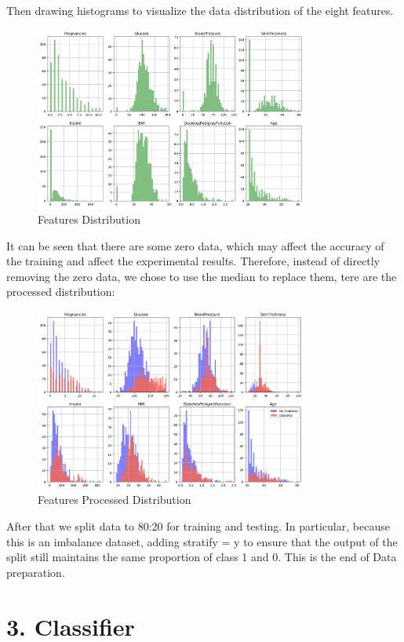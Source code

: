 \documentclass[11pt]{article}
\begin{document}
Then drawing histograms to visualize the data distribution of the eight features.
\begin{figure}[H]
    \centering
    \includegraphics[width=0.8\textwidth]{h8}
    \caption{Features Distribution}
\end{figure}

It can be seen that there are some zero data, which may affect the accuracy of the training and affect the experimental results. Therefore, instead of directly removing the zero data, we chose to use the median to replace them, tere are the processed distribution:
\begin{figure}[H]
    \centering
    \includegraphics[width=0.8\textwidth]{h8opt}
    \caption{Features Processed Distribution}
\end{figure}

After that we split data to 80:20 for training and testing. In particular, because this is an imbalance dataset, adding stratify = y to ensure that the output of the split still maintains the same proportion of class 1 and 0. This is the end of Data preparation.



\section{3. Classifier}
\end{document}
